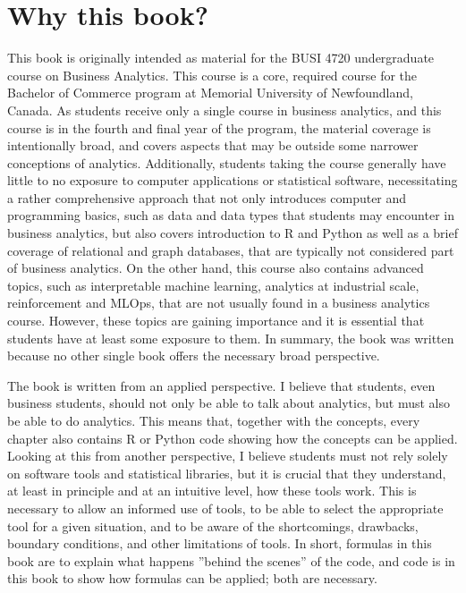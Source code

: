 %
%
\section*{Why this book?}

This book is originally intended as material for the BUSI 4720 undergraduate course on Business Analytics. This course is a core, required course for the Bachelor of Commerce program at Memorial University of Newfoundland, Canada. As students receive only a single course in business analytics, and this course is in the fourth and final year of the program, the material coverage is intentionally broad, and covers aspects that may be outside some narrower conceptions of analytics. Additionally, students taking the course generally have little to no exposure to computer applications or statistical software, necessitating a rather comprehensive approach that not only introduces computer and programming basics, such as data and data types that students may encounter in business analytics, but also covers introduction to R and Python as well as a brief coverage of relational and graph databases, that are typically not considered part of business analytics. On the other hand, this course also contains advanced topics, such as interpretable machine learning, analytics at industrial scale, reinforcement and MLOps, that are not usually found in a business analytics course. However, these topics are gaining importance and it is essential that students have at least some exposure to them. In summary, the book was written because no other single book offers the necessary broad perspective. 

The book is written from an applied perspective. I believe that students, even business students, should not only be able to talk about analytics, but must also be able to do analytics. This means that, together with the concepts, every chapter also contains R or Python code showing how the concepts can be applied. Looking at this from another perspective, I believe students must not rely solely on software tools and statistical libraries, but it is crucial that they understand, at least in principle and at an intuitive level, how these tools work. This is necessary to allow an informed use of tools, to be able to select the appropriate tool for a given situation, and to be aware of the shortcomings, drawbacks, boundary conditions, and other limitations of tools. In short, formulas in this book are to explain what happens ''behind the scenes'' of the code, and code is in this book to show how formulas can be applied; both are necessary.

